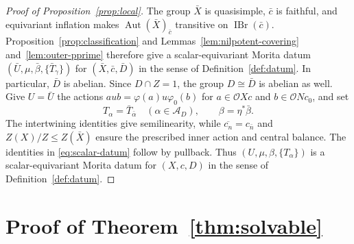 \documentclass[11pt,a4paper]{article}
\theoremstyle{definition}
\theoremstyle{remark}
\numberwithin{equation}{section}
\newcommand{\cO}{\mathcal{O}}
\DeclareMathOperator{\IBr}{IBr}
\DeclareMathOperator{\Aut}{Aut}
\begin{document}
\begin{proof}[Proof of Proposition~\ref{prop:local}]
		The group $\bar X$ is quasisimple, $\bar c$ is faithful, and
		equivariant inflation makes $\Aut(\bar X)_{\bar c}$ transitive
		on $\IBr(\bar c)$.
		Proposition~\ref{prop:classification} and
		Lemmas~\ref{lem:nilpotent-covering} and~\ref{lem:outer-pprime}
		therefore give a scalar-equivariant Morita datum
		$(\bar U,\mu,\bar\beta,\{\bar T_\gamma\})$ for
		$(\bar X,\bar c,\bar D)$ in the sense of Definition~\ref{def:datum}.
		In particular, $\bar D$ is abelian. Since $D\cap Z=1$,
		the group $D\cong\bar D$ is abelian as well.
		Give $U=\bar U$ the actions $aub=\varphi(a)u\varphi_0(b)$
		for $a\in\cO Xc$ and $b\in\cO Nc_0$, and set
		\[
		T_\alpha=\bar T_{\bar\alpha}\quad(\alpha\in\mathcal A_D),
		\qquad \beta=\eta^*\bar\beta.
		\]
		The intertwining identities give semilinearity, while
		$\overline{c_n}=c_{\bar n}$ and $Z(X)/Z\leq Z(\bar X)$
		ensure the prescribed inner action and central balance.
		The identities in \eqref{eq:scalar-datum} follow by pullback.
		Thus $(U,\mu,\beta,\{T_\alpha\})$ is a scalar-equivariant Morita datum
		for $(X,c,D)$ in the sense of Definition~\ref{def:datum}.
	\end{proof}
	
	
	\section{Proof of Theorem~\ref*{thm:solvable}}\label{sec:reduction}
	
\end{document}
